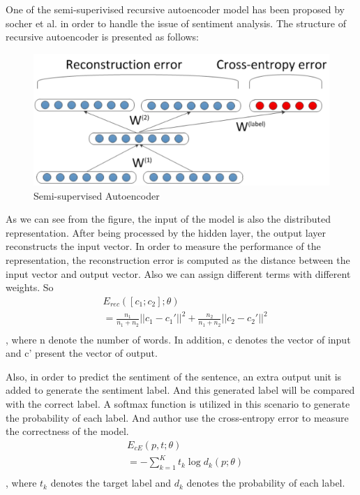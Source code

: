 \documentclass[dvips,12pt]{article}
\begin{document}
One of the semi-superivised recursive autoencoder model has been proposed by socher et al.\cite{socher2011semi} in order to handle the issue of sentiment analysis. The structure of recursive autoencoder is presented as follows:
\begin{figure}[ht]
\centering
\includegraphics[width = 1.0\linewidth]{figure/semiautoencoder}
\caption{Semi-supervised Autoencoder}
\label{fig:sae}
\end{figure}	
	
As we can see from the figure, the input of the model is also the distributed representation. After being processed by the hidden layer, the output layer reconstructs the input vector. In order to measure the performance of the representation, the reconstruction error is computed as the distance between the input vector and output vector. Also we can assign different terms with different weights. So
\begin{equation}
\begin{split}
 & E_{rec}([c_{1};c_{2}];\theta) \\
 & = \frac{n_{1}}{n_{1}+n_{2}} ||c_{1}-c_{1}'||^2 + \frac{n_{2}}{n_{1}+n_{2}} ||c_{2}-c_{2}'||^2\\
 \end{split}
\end{equation}
, where n denote the number of words. In addition, c denotes the vector of input and c' present the vector of output.

Also, in order to predict the sentiment of the sentence, an extra output unit is added to generate the sentiment label. And this generated label will be compared with the correct label. A softmax function is utilized in this scenario to generate the probability of each label. And author use the cross-entropy error to measure the correctness of the model.
\begin{equation}
\begin{split}
 & E_{cE}(p,t;\theta) \\
 & = -\sum_{k=1}^{K}{t_{k}\log{}d_{k}(p;\theta)}\\
 \end{split}
\end{equation}
, where $t_{k}$ denotes the target label and $d_{k}$ denotes the probability of each label.
\end{document}
